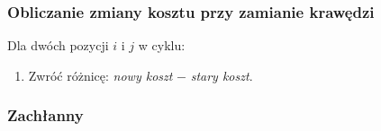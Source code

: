 \documentclass[11pt]{article}
\begin{document}
\subsubsection{Obliczanie zmiany kosztu przy zamianie krawędzi}

Dla dwóch pozycji $i$ i $j$ w cyklu:
\begin{enumerate}
    \begin{enumerate}
        \item Wyznacz wierzchołki poprzedzające i następujące po $i$ i po $j$.
        \item Oblicz sumę długości krawędzi: przed zamianą $i$ i $j$.
        \begin{enumerate}
            \item długość $i-1 -> i$ + długość $j -> j+1$
        \end{enumerate}
        \item Oblicz sumę długości po zamianie krawędzi:
        \begin{enumerate}
            \item długość $i-1 -> j-1$ + długość $i -> j$
        \end{enumerate}
    \end{enumerate}
    \item Zwróć różnicę: \textit{nowy koszt} $-$ \textit{stary koszt}.
\end{enumerate}


\subsubsection{Zachłanny}\label{subsec:zachanny}
\end{document}
